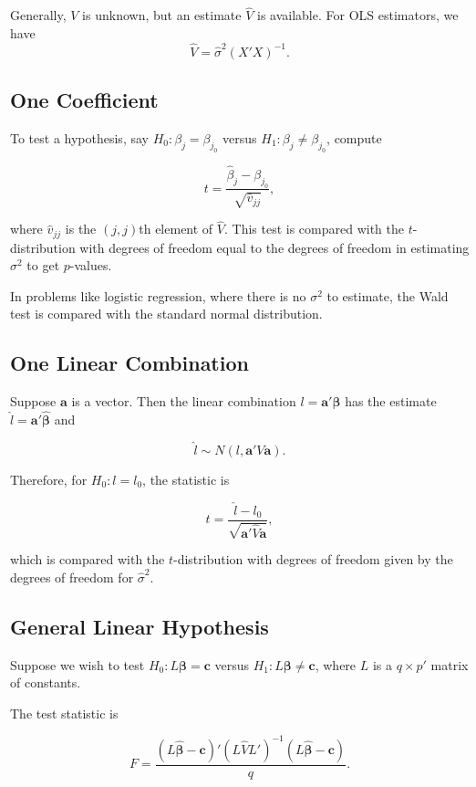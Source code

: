 \documentclass[14pt]{extarticle}
\begin{document}
Generally, $V$ is unknown, but an estimate $\hat{V}$ is available. For OLS estimators, we have
\[
\hat{V} = \hat{\sigma}^2 (X' X)^{-1}.
\]

\subsection*{One Coefficient}
To test a hypothesis, say $H_0: \beta_j = \beta_{j_0}$ versus $H_1: \beta_j \neq \beta_{j_0}$, compute

\[
t = \frac{\hat{\beta}_j - \beta_{j_0}}{\sqrt{\hat{v}_{jj}}},
\]

where $\hat{v}_{jj}$ is the $(j,j)$th element of $\hat{V}$. This test is compared with the $t$-distribution with degrees of freedom equal to the degrees of freedom in estimating $\sigma^2$ to get $p$-values.

In problems like logistic regression, where there is no $\sigma^2$ to estimate, the Wald test is compared with the standard normal distribution.

\subsection*{One Linear Combination}

Suppose $\bm{a}$ is a vector. Then the linear combination $l = \bm{a}'\bm{\beta}$ has the estimate $\hat{l} = \bm{a}'\hat{\bm{\beta}}$ and

\[
\hat{l} \sim N(l, \bm{a}'V\bm{a}).
\]

Therefore, for $H_0: l = l_0$, the statistic is

\[
t = \frac{\hat{l} - l_0}{\sqrt{\bm{a}'\hat{V}\bm{a}}},
\]

which is compared with the $t$-distribution with degrees of freedom given by the degrees of freedom for $\hat{\sigma}^2$.

\subsection*{General Linear Hypothesis}

Suppose we wish to test \(H_0: L\boldsymbol{\beta} = \boldsymbol{c}\) versus \(H_1: L\boldsymbol{\beta} \neq \boldsymbol{c}\), where \(L\) is a \(q \times p'\) matrix of constants. 

The test statistic is 

\[
F = \frac{(L\hat{\boldsymbol{\beta}} - \boldsymbol{c})' (L \hat{V} L')^{-1} (L\hat{\boldsymbol{\beta}} - \boldsymbol{c})}{q}.
\]
\end{document}
